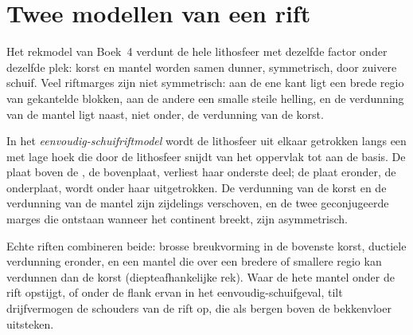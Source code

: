 \section{Twee modellen van een rift}\label{sec:b3:extension-strike-slip:models}

Het rekmodel van Boek~4 verdunt de hele lithosfeer met
dezelfde factor onder dezelfde plek: korst en mantel worden samen dunner,
symmetrisch, door zuivere schuif. Veel riftmarges zijn niet symmetrisch: aan de ene kant
ligt een brede regio van gekantelde blokken, aan de andere een smalle steile helling, en de
verdunning van de mantel ligt naast, niet onder, de verdunning van de korst.

\begin{definition}\label{def:b3:extension-strike-slip:rift-models}
In het \emph{eenvoudig-schuifriftmodel} wordt de
lithosfeer uit elkaar getrokken langs een  met lage hoek die
door de lithosfeer snijdt van het oppervlak tot aan de basis. De plaat boven de , de bovenplaat,
verliest haar onderste deel; de plaat eronder, de onderplaat, wordt
onder haar uitgetrokken. De verdunning van de korst en de verdunning van de mantel zijn
zijdelings verschoven, en de twee geconjugeerde marges die ontstaan wanneer het continent
breekt, zijn asymmetrisch.
\end{definition}

Echte riften combineren beide: brosse breukvorming in de bovenste korst, ductiele verdunning
eronder, en een mantel die over een bredere of smallere regio kan verdunnen dan de
korst (diepteafhankelijke rek). Waar de hete mantel onder de
rift opstijgt, of onder de flank ervan in het eenvoudig-schuifgeval, tilt drijfvermogen de
schouders van de rift op, die als bergen boven de bekkenvloer uitsteken.

